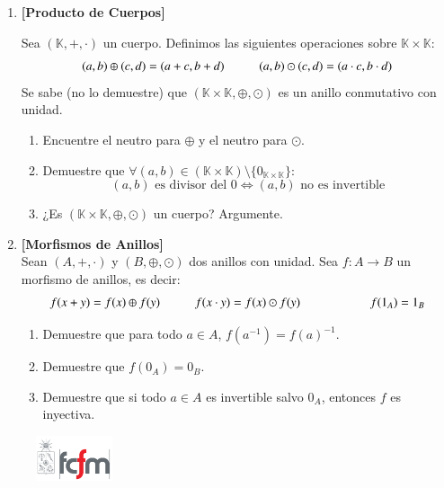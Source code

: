 \documentclass[letterpaper,10pt]{article}
\newcommand{\K}{\mathbb K}
\theoremstyle{plain}
\begin{document}
\begin{enumerate}[\bf P1.]
    \item \textbf{[Producto de Cuerpos]}
    
    Sea $(\K, + , \cdot)$ un cuerpo. Definimos las siguientes operaciones sobre $\K \times \K$:
        $$
        (a,b)\oplus (c,d)=(a+c,b+d) \hspace{10 mm} (a,b) \odot (c,d) = (a\cdot c, b\cdot d )
        $$
        Se sabe (no lo demuestre) que $(\K \times \K, \oplus , \odot )$ es un anillo conmutativo con unidad.
        \begin{enumerate}
        	\item Encuentre el neutro para $\oplus$ y el neutro para $\odot$.
        	\item Demuestre que $\forall (a,b) \in( \K \times \K )\setminus \{0_{\K\times \K}\}$:
        	$$
        	(a,b) \text{ es divisor del 0} \iff (a,b) \text{ no es invertible}  
        	$$
        	\item ¿Es $(\K \times \K, \oplus , \odot )$ un cuerpo? Argumente.
        \end{enumerate}
    \item \textbf{[Morfismos de Anillos]} \\
    Sean $(A,+,\cdot)$ y $(B,\oplus, \odot)$ dos anillos con unidad. Sea $f: A \to B$ un morfismo de anillos, es decir:
    $$	f(x+ y)=f(x)\oplus f(y) \hspace{10 mm} f(x \cdot y)=f(x ) \odot f(y) \hspace{10 mm} \hspace{10 mm} f(1_A)=1_B $$
        \begin{enumerate} 
            \item Demuestre que para todo $a \in A$, $f(a^{-1})=f(a)^{-1}$.  
            \item Demuestre que $f(0_A)=0_B$.
            \item Demuestre que si todo $a \in A$ es invertible salvo $0_A$, entonces $f$ es inyectiva.
        \end{enumerate}
\end{enumerate}

\newpage 
\begin{figure} %
    \vspace{-5mm}
    \includegraphics[width=0.2\textwidth]{img/fcfm2.png}
\end{figure}
\end{document}
